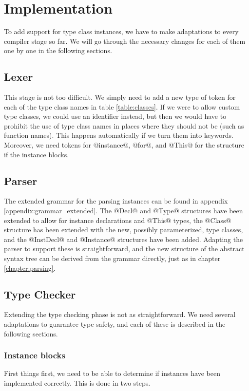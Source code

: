 \section{Implementation}
To add support for type class instances, we have to make adaptations to every compiler stage so far. We will go through the necessary changes for each of them one by one in the following sections.

\subsection{Lexer}
This stage is not too difficult. We simply need to add a new type of token for each of the type class names in table \ref{table:classes}. If we were to allow custom type classes, we could use an identifier instead, but then we would have to prohibit the use of type class names in places where they should not be (such as function names). This happens automatically if we turn them into keywords. Moreover, we need tokens for @instance@, @for@, and @This@ for the structure if the instance blocks.

\subsection{Parser}
The extended grammar for the parsing instances can be found in appendix \ref{appendix:grammar_extended}. The @Decl@ and @Type@ structures have been extended to allow for instance declarations and @This@ types, the @Class@ structure has been extended with the new, possibly parameterized, type classes, and the @InstDecl@ and @Instance@ structures have been added. Adapting the parser to support these is straightforward, and the new structure of the abstract syntax tree can be derived from the grammar directly, just as in chapter \ref{chapter:parsing}.

\subsection{Type Checker}
Extending the type checking phase is not as straightforward. We need several adaptations to guarantee type safety, and each of these is described in the following sections.

\subsubsection{Instance blocks}
First things first, we need to be able to determine if instances have been implemented correctly. This is done in two steps.

